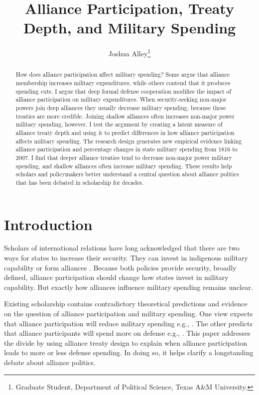 \documentclass[12pt]{article}
\title{\textbf{Alliance Participation, Treaty Depth, and Military Spending}}
\author{Joshua Alley\footnote{Graduate Student,
Department of Political Science, Texas A\&M University.}}
\date{}
\begin{document}
\maketitle 

\doublespace 

\begin{abstract}
How does alliance participation affect military spending? 
Some argue that alliance membership increases military expenditures, while others contend that it produces spending cuts.
I argue that deep formal defense cooperation modifies the impact of alliance participation on military expenditures.  
When security-seeking non-major powers join deep alliances they usually decrease military spending, because these treaties are more credible.
Joining shallow alliances often increases non-major power military spending, however.    
I test the argument by creating a latent measure of alliance treaty depth and using it to predict differences in how alliance participation affects military spending. 
The research design generates new empirical evidence linking alliance participation and percentage changes in state military spending from 1816 to 2007. 
I find that deeper alliance treaties tend to decrease non-major power military spending, and shallow alliances often increase military spending.  
These results help scholars and policymakers better understand a central question about alliance politics that has been debated in scholarship for decades. 
\end{abstract}


\newpage 


\section{Introduction}


Scholars of international relations have long acknowledged that there are two ways for states to increase their security. 
They can invest in indigenous military capability or form alliances \citep{Morgenthau1948, Altfield1984, Morrow1993}.
Because both policies provide security, broadly defined, alliance participation should change how states invest in military capability. 
But exactly how alliances influence military spending remains unclear. 


Existing scholarship contains contradictory theoretical predictions and evidence on the question of alliance participation and military spending. 
One view expects that alliance participation will reduce military spending e.g., \citep{BarnettLevy1991, Morrow1993, Conybeare1994}. 
The other predicts that alliance participants will spend more on defense e.g., \citep{Diehl1994, MorganPalmer2006, QuirozFlores2011}.
This paper addresses the divide by using alliance treaty design to explain when alliance participation leads to more or less defense spending. 
In doing so, it helps clarify a longstanding debate about alliance politics.
\end{document}
